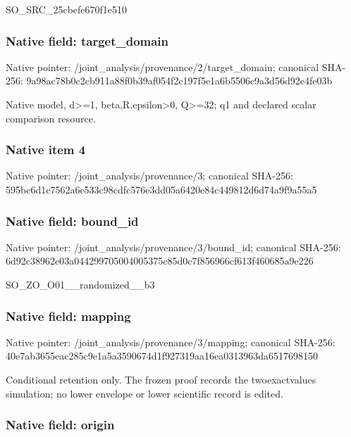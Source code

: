 \documentclass[10pt,a4paper]{article}
\begin{document}
SO\_SRC\_25cbefe670f1e510


\subsubsection{Native field: target\_domain}


Native pointer: /joint\_analysis/provenan\allowbreak{}ce/2/target\_domain; canonical SHA-256: 9a98ac78b0c2cb911a88f0b3\allowbreak{}9af054f2c197f5e1a6b5506c\allowbreak{}9a3d56d92c4fe03b


Native model, d>=1, beta,R,epsilon>0, Q>=32; q1 and declared scalar comparison resource.


\subsubsection{Native item 4}


Native pointer: /joint\_analysis/provenance/3; canonical SHA-256: 595bc6d1c7562a6e533c98cd\allowbreak{}fc576e3dd05a6420e84c4498\allowbreak{}12d6d74a9f9a55a5



\subsubsection{Native field: bound\_id}


Native pointer: /joint\_analysis/provenance/3/bound\_id; canonical SHA-256: 6d92c38962e03a0442997050\allowbreak{}04005375c85d0c7f856966cf\allowbreak{}613f460685a9e226


SO\_ZO\_O01\_\_randomized\_\_b3


\subsubsection{Native field: mapping}


Native pointer: /joint\_analysis/provenance/3/mapping; canonical SHA-256: 40e7ab3655eac285c9e1a5a3\allowbreak{}590674d1f927319aa16ea031\allowbreak{}3963da6517698150


Conditional retention only. The frozen proof records the twoexactvalues simulation; no lower envelope or lower scientific record is edited.


\subsubsection{Native field: origin}
\end{document}
